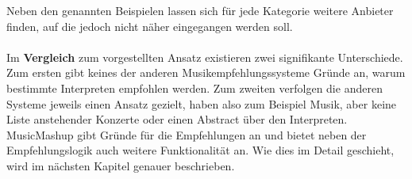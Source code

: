 Neben den genannten Beispielen lassen sich für jede Kategorie weitere Anbieter finden, auf die jedoch nicht näher eingegangen werden soll.

\paragraph{} Im \textbf{Vergleich} zum vorgestellten Ansatz existieren zwei signifikante Unterschiede. Zum ersten gibt keines der anderen Musikempfehlungssysteme Gründe an, warum bestimmte Interpreten empfohlen werden. Zum zweiten verfolgen die anderen Systeme jeweils einen Ansatz gezielt, haben also zum Beispiel Musik, aber keine Liste anstehender Konzerte oder einen Abstract über den Interpreten. MusicMashup gibt Gründe für die Empfehlungen an und bietet neben der Empfehlungslogik auch weitere Funktionalität an. Wie dies im Detail geschieht, wird im nächsten Kapitel genauer beschrieben.